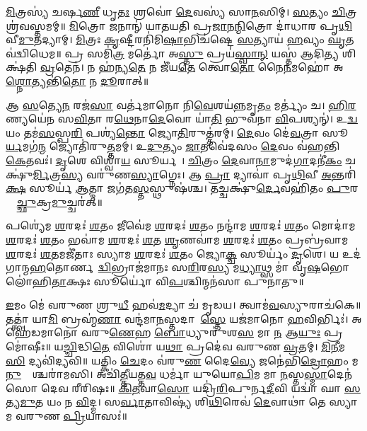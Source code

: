 \ul{𑌮𑌿}𑌤𑍍𑌰𑌸𑍍𑌯॑ 𑌚𑌰𑍍\mbox{}𑌷\ul{𑌣𑍀} 𑌧𑍃\ul{𑌤𑌃} 𑌶𑍍𑌰𑌵𑍋॑ \ul{𑌦𑍇}𑌵𑌸𑍍𑌯॑ 𑌸𑌾\ul{𑌨}𑌸𑌿𑌮𑍍। \ul{𑌸}𑌤𑍍𑌯𑌂 \ul{𑌚𑌿}𑌤𑍍𑌰𑌶𑍍𑌰॑𑌵𑌸𑍍𑌤𑌮𑌮𑍍॥ \ul{𑌮𑌿}𑌤𑍍𑌰𑍋 𑌜𑌨𑌾𑌨𑍍॑ 𑌯𑌾𑌤𑌯𑌤𑌿 𑌪𑍍𑌰\ul{𑌜𑌾}𑌨\ul{𑌨𑍍𑌮𑌿}𑌤𑍍𑌰𑍋 𑌦𑌾॑𑌧𑌾𑌰 𑌪𑍃\ul{𑌥𑌿}𑌵𑍀\ul{𑌮𑍁}𑌤𑌦𑍍𑌯𑌾𑌮𑍍। \ul{𑌮𑌿}𑌤𑍍𑌰𑌃 \ul{𑌕𑍃}𑌷𑍍𑌟𑍀𑌰𑌨𑌿॑𑌮𑌿\ul{𑌷𑌾}𑌭𑌿𑌚॑𑌷𑍍𑌟𑍇 \ul{𑌸}𑌤𑍍𑌯𑌾𑌯॑ \ul{𑌹}𑌵𑍍𑌯𑌂 \ul{𑌘𑍃}𑌤𑌵॑𑌦𑍍𑌵𑌿𑌧𑍇𑌮॥ 𑌪𑍍𑌰 𑌸𑌮𑌿॑\ul{𑌤𑍍𑌰} 𑌮𑌰𑍍𑌤𑍋॑ 𑌅\ul{𑌸𑍍𑌤𑍁} 𑌪𑍍𑌰𑌯॑\ul{𑌸𑍍𑌵𑌾}\ul{𑌨𑍍} 𑌯𑌸𑍍𑌤॑ 𑌆𑌦𑌿\ul{𑌤𑍍𑌯} 𑌶𑌿𑌕𑍍𑌷॑𑌤𑌿 \ul{𑌵𑍍𑌰}𑌤𑍇𑌨॑। 𑌨 𑌹॑𑌨𑍍𑌯\ul{𑌤𑍇} 𑌨 𑌜𑍀॑𑌯\ul{𑌤𑍇} 𑌤𑍍𑌵𑍋\ul{𑌤𑍋} 𑌨𑍈\ul{𑌨}𑌮𑌹𑍋॑ 𑌅\ul{𑌶𑍍𑌨𑍋}𑌤𑍍𑌯𑌨𑍍𑌤𑌿॑\ul{𑌤𑍋} 𑌨 \ul{𑌦𑍂}𑌰𑌾𑌤𑍍॥

𑌆 \ul{𑌸}𑌤𑍍𑌯𑍇\ul{𑌨} 𑌰𑌜॑\ul{𑌸𑌾} 𑌵𑌰𑍍𑌤॑𑌮𑌾𑌨𑍋 𑌨𑌿\ul{𑌵𑍇}𑌶𑌯॑\ul{𑌨𑍍𑌨}𑌮𑍃\ul{𑌤𑌂} 𑌮𑌰𑍍𑌤𑍍𑌯𑌂॑ 𑌚। \ul{𑌹𑌿}\ul{𑌰}𑌣𑍍𑌯𑌯𑍇॑𑌨 𑌸\ul{𑌵𑌿}𑌤𑌾 𑌰\ul{𑌥𑍇}𑌨𑌾\ul{𑌦𑍇}𑌵𑍋 𑌯𑌾॑\ul{𑌤𑌿} 𑌭𑍁𑌵॑𑌨𑌾 \ul{𑌵𑌿}𑌪𑌶𑍍𑌯𑌨𑍍॑। 𑌉\ul{𑌦𑍍𑌵}𑌯𑌂 𑌤𑌮॑\ul{𑌸}𑌸𑍍𑌪\ul{𑌰𑌿} 𑌪𑌶𑍍𑌯॑\ul{𑌨𑍍𑌤𑍋} 𑌜𑍍𑌯𑍋\ul{𑌤𑌿}𑌰𑍁𑌤𑍍𑌤॑𑌰𑌮𑍍। \ul{𑌦𑍇}𑌵𑌂 𑌦𑍇॑\ul{𑌵}𑌤𑍍𑌰𑌾 𑌸𑍂\ul{𑌰𑍍𑌯}𑌮𑌗॑\ul{𑌨𑍍𑌮} 𑌜𑍍𑌯𑍋𑌤𑌿॑𑌰𑍁\ul{𑌤𑍍𑌤}𑌮𑌮𑍍। 𑌉\ul{𑌦𑍁}𑌤𑍍𑌯𑌂 \ul{𑌜𑌾}𑌤𑌵𑍇॑𑌦𑌸𑌂 \ul{𑌦𑍇}𑌵𑌂 𑌵॑𑌹𑌨𑍍𑌤𑌿 \ul{𑌕𑍇}𑌤𑌵𑌃॑। \ul{𑌦𑍃}𑌶𑍇 𑌵𑌿𑌶𑍍𑌵𑌾॑\ul{𑌯} 𑌸𑍂𑌰𑍍𑌯𑌮𑍍᳚। \ul{𑌚𑌿}𑌤𑍍𑌰𑌂 \ul{𑌦𑍇}𑌵𑌾\ul{𑌨𑌾}𑌮𑍁𑌦॑\ul{𑌗𑌾}𑌦𑌨𑍀॑\ul{𑌕𑌂} 𑌚𑌕𑍍𑌷𑍁॑\ul{𑌰𑍍𑌮𑌿}𑌤𑍍𑌰\ul{𑌸𑍍𑌯} 𑌵𑌰𑍁॑𑌣\ul{𑌸𑍍𑌯𑌾}𑌗𑍍𑌨𑍇𑌃। 𑌆 \ul{𑌪𑍍𑌰𑌾} 𑌦𑍍𑌯𑌾𑌵𑌾॑ 𑌪𑍃\ul{𑌥𑌿}𑌵𑍀 \ul{𑌅}𑌨𑍍𑌤𑌰𑌿॑\ul{𑌕𑍍𑌷}\ul{} 𑌸𑍂𑌰𑍍𑌯॑ \ul{𑌆}𑌤𑍍𑌮𑌾 𑌜𑌗॑𑌤\ul{𑌸𑍍𑌤}𑌸𑍍𑌥𑍁𑌷॑𑌶𑍍𑌚। 𑌤𑌚𑍍𑌚𑌕𑍍𑌷𑍁॑\ul{𑌰𑍍𑌦𑍇}𑌵𑌹𑌿॑𑌤𑌂 \ul{𑌪𑍁}𑌰𑌸𑍍𑌤𑌾᳚\ul{𑌚𑍍𑌛𑍁}𑌕𑍍𑌰\ul{𑌮𑍁}𑌚𑍍𑌚𑌰॑𑌤𑍍॥

𑌪𑌶𑍍𑌯𑍇॑𑌮 \ul{𑌶}𑌰𑌦𑌃॑ \ul{𑌶}𑌤𑌂 𑌜𑍀𑌵𑍇॑𑌮 \ul{𑌶}𑌰𑌦𑌃॑ \ul{𑌶}𑌤𑌂 𑌨𑌨𑍍𑌦𑌾॑𑌮 \ul{𑌶}𑌰𑌦𑌃॑ \ul{𑌶}𑌤𑌂 𑌮𑍋𑌦𑌾॑𑌮 \ul{𑌶}𑌰𑌦𑌃॑ \ul{𑌶}𑌤𑌂 𑌭𑌵𑌾॑𑌮 \ul{𑌶}𑌰𑌦𑌃॑ \ul{𑌶}𑌤 \ul{𑌶𑍃}𑌣𑌵𑌾॑𑌮 \ul{𑌶}𑌰𑌦𑌃॑ \ul{𑌶}𑌤𑌂 𑌪𑍍𑌰𑌬𑍍𑌰॑𑌵𑌾𑌮 \ul{𑌶}𑌰𑌦𑌃॑ \ul{𑌶}𑌤𑌮𑌜𑍀॑𑌤𑌾𑌃 𑌸𑍍𑌯𑌾𑌮 \ul{𑌶}𑌰𑌦𑌃॑ \ul{𑌶}𑌤𑌂 𑌜𑍍𑌯𑍋\ul{𑌕𑍍𑌚} 𑌸𑍂𑌰𑍍𑌯𑌂॑ \ul{𑌦𑍃}𑌶𑍇। 𑌯 𑌉𑌦॑𑌗𑌾𑌨𑍍𑌮\ul{𑌹}𑌤𑍋𑌰𑍍𑌣𑌵𑌾᳚\ul{𑌦𑍍𑌵𑌿}𑌭𑍍𑌰𑌾𑌜॑𑌮𑌾𑌨𑌃 𑌸\ul{𑌰𑌿}𑌰\ul{𑌸𑍍𑌯} 𑌮\ul{𑌧𑍍𑌯𑌾}𑌥𑍍𑌸 𑌮𑌾॑ 𑌵𑍃\ul{𑌷}𑌭𑍋 𑌲𑍋॑𑌹𑌿\ul{𑌤𑌾}𑌕𑍍𑌷𑌃 𑌸𑍂𑌰𑍍𑌯𑍋॑ 𑌵𑌿\ul{𑌪}𑌶𑍍𑌚𑌿𑌨𑍍𑌮𑌨॑𑌸𑌾 𑌪𑍁𑌨𑌾𑌤𑍁॥

\ul{𑌇}𑌮𑌂 𑌮𑍇॑ 𑌵𑌰𑍁𑌣 𑌶𑍍𑌰𑍁\ul{𑌧𑍀} 𑌹𑌵॑\ul{𑌮}𑌦𑍍𑌯𑌾 𑌚॑ 𑌮𑍃𑌡𑌯। 𑌤𑍍𑌵𑌾𑌮॑\ul{𑌵}𑌸𑍍𑌯𑍁𑌰𑌾𑌚॑𑌕𑍇॥ 𑌤𑌤𑍍𑌤𑍍𑌵𑌾॑ 𑌯𑌾\ul{𑌮𑌿} 𑌬𑍍𑌰𑌹𑍍𑌮॑\ul{𑌣𑌾} 𑌵𑌨𑍍𑌦॑𑌮𑌾\ul{𑌨}𑌸𑍍𑌤𑌦𑌾𑌶𑌾᳚\ul{𑌸𑍍𑌤𑍇} 𑌯𑌜॑𑌮𑌾𑌨𑍋 \ul{𑌹}𑌵𑌿𑌰𑍍𑌭𑌿𑌃॑। 𑌅𑌹𑍇॑𑌡𑌮𑌾𑌨𑍋 𑌵𑌰𑍁\ul{𑌣𑍇}𑌹 \ul{𑌬𑍋}𑌧𑍍𑌯𑍁𑌰𑍁॑𑌶\ul{𑌸} 𑌮𑌾 \ul{𑌨} 𑌆\ul{𑌯𑍁𑌃} 𑌪𑍍𑌰𑌮𑍋॑𑌷𑍀𑌃॥
𑌯\ul{𑌚𑍍𑌚𑌿}𑌦𑍍𑌧𑌿\ul{𑌤𑍇} 𑌵𑌿𑌶𑍋॑ 𑌯\ul{𑌥𑌾} 𑌪𑍍𑌰𑌦𑍇॑𑌵 𑌵𑌰𑍁𑌣 \ul{𑌵𑍍𑌰}𑌤𑌮𑍍। \ul{𑌮𑌿}\ul{𑌨𑍀}𑌮\ul{𑌸𑌿} 𑌦𑍍𑌯𑌵𑌿॑𑌦𑍍𑌯𑌵𑌿॥ 𑌯𑌤𑍍𑌕𑌿𑌂 \ul{𑌚𑍇}𑌦𑌂 𑌵॑𑌰𑍁\ul{𑌣} 𑌦𑍈\ul{𑌵𑍍𑌯𑍇} 𑌜𑌨𑍇॑𑌭𑌿\ul{𑌦𑍍𑌰𑍋}𑌹𑌂 𑌮\ul{𑌨𑍁}𑌷𑍍𑌯𑌾᳚𑌶𑍍𑌚𑌰𑌾॑𑌮𑌸𑌿। 𑌅𑌚𑌿॑\ul{𑌤𑍍𑌤𑍀}𑌯𑌤𑍍𑌤\ul{𑌵} 𑌧𑌰𑍍𑌮𑌾॑ 𑌯𑍁𑌯𑍋\ul{𑌪𑌿}𑌮 𑌮𑌾 \ul{𑌨}𑌸𑍍𑌤\ul{𑌸𑍍𑌮𑌾}𑌦𑍇𑌨॑𑌸𑍋 𑌦𑍇𑌵 𑌰𑍀𑌰𑌿𑌷𑌃॥ \ul{𑌕𑌿}\ul{𑌤}𑌵𑌾\ul{𑌸𑍋} 𑌯𑌦𑍍𑌰𑌿॑\ul{𑌰𑌿}𑌪𑍁𑌰𑍍𑌨\ul{𑌦𑍀}𑌵𑌿 𑌯𑌦𑍍𑌵𑌾॑ 𑌘𑌾 \ul{𑌸}𑌤𑍍𑌯\ul{𑌮𑍁}𑌤 𑌯𑌂 𑌨 \ul{𑌵𑌿}𑌦𑍍𑌮। 𑌸\ul{𑌰𑍍𑌵𑌾}𑌤𑌾𑌵𑌿𑌷𑍍𑌯॑ 𑌶𑌿\ul{𑌥𑌿}𑌰𑍇𑌵॑ \ul{𑌦𑍇}𑌵𑌾𑌥𑌾॑ 𑌤𑍇 𑌸𑍍𑌯𑌾𑌮 𑌵𑌰𑍁𑌣 \ul{𑌪𑍍𑌰𑌿}𑌯𑌾𑌸𑌃॑॥
